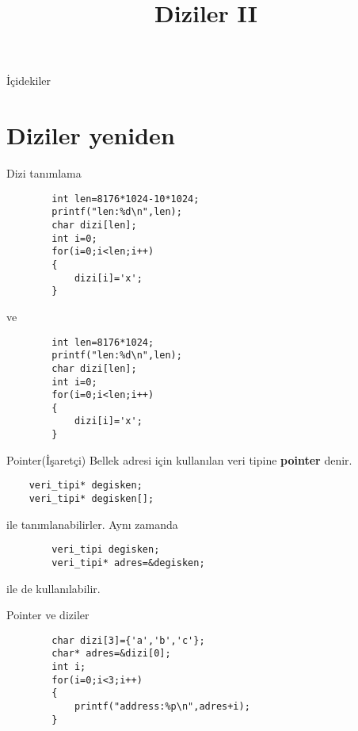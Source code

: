 
\title[Ders 5] {Diziler II}

\frame{\titlepage}
\begin{frame}[fragile]{İçidekiler}
    \tableofcontents
\end{frame}
\section{Diziler yeniden}
\begin{frame}[fragile]{Dizi tanımlama}
    \begin{lstlisting}
        int len=8176*1024-10*1024;
        printf("len:%d\n",len);
        char dizi[len];
        int i=0;
        for(i=0;i<len;i++)
        {
            dizi[i]='x';
        }\end{lstlisting}
    ve
    \begin{lstlisting}
        int len=8176*1024;
        printf("len:%d\n",len);
        char dizi[len];
        int i=0;
        for(i=0;i<len;i++)
        {
            dizi[i]='x';
        }\end{lstlisting}
\end{frame}
\begin{frame}[fragile]{Pointer(İşaretçi)}
    Bellek adresi için kullanılan veri tipine \textbf{pointer} denir.
    \begin{lstlisting}
    veri_tipi* degisken;    
    veri_tipi* degisken[];\end{lstlisting}
    ile tanımlanabilirler. Aynı zamanda
    \begin{lstlisting}
        veri_tipi degisken;    
        veri_tipi* adres=&degisken;\end{lstlisting}
    ile de kullanılabilir.
\end{frame}
\begin{frame}[fragile]{Pointer ve diziler}
    \begin{lstlisting}
        char dizi[3]={'a','b','c'};
        char* adres=&dizi[0];
        int i;
        for(i=0;i<3;i++)
        {
            printf("address:%p\n",adres+i);
        }
    \end{lstlisting}
\end{frame}
